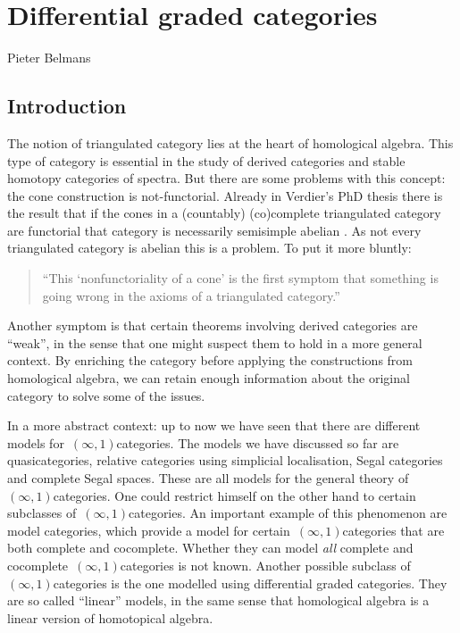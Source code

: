 \chapter{Differential graded categories}
\begin{flushright}
  Pieter Belmans
\end{flushright}

\section{Introduction}
The notion of triangulated category lies at the heart of homological algebra. This type of category is essential in the study of derived categories and stable homotopy categories of spectra. But there are some problems with this concept: the cone construction is not-functorial. Already in Verdier's PhD thesis there is the result that if the cones in a (countably) (co)complete triangulated category are functorial that category is necessarily semisimple abelian \cite[proposition II.1.2.13]{verdierphd}. As not every triangulated category is abelian \cite[exercise 1.4.5]{weibel} this is a problem. To put it more bluntly:
\begin{quote}
  ``This `nonfunctoriality of a cone' is the first symptom that something is going wrong in the axioms of a triangulated category.''
\end{quote}
\begin{flushright}
  \cite[section IV.7]{gelfandmanin}
\end{flushright}
Another symptom is that certain theorems involving derived categories are ``weak'', in the sense that one might suspect them to hold in a more general context. By enriching the category before applying the constructions from homological algebra, we can retain enough information about the original category to solve some of the issues.

In a more abstract context: up to now we have seen that there are different models for~$(\infty,1)$\dash categories. The models we have discussed so far are quasicategories, relative categories using simplicial localisation, Segal categories and complete Segal spaces. These are all models for the general theory of~$(\infty,1)$\dash categories. One could restrict himself on the other hand to certain subclasses of~$(\infty,1)$\dash categories. An important example of this phenomenon are model categories, which provide a model for certain~$(\infty,1)$\dash categories that are both complete and cocomplete. Whether they can model \emph{all} complete and cocomplete~$(\infty,1)$\dash categories is not known. Another possible subclass of~$(\infty,1)$\dash categories is the one modelled using differential graded categories. They are so called ``linear'' models, in the same sense that homological algebra is a linear version of homotopical algebra.


